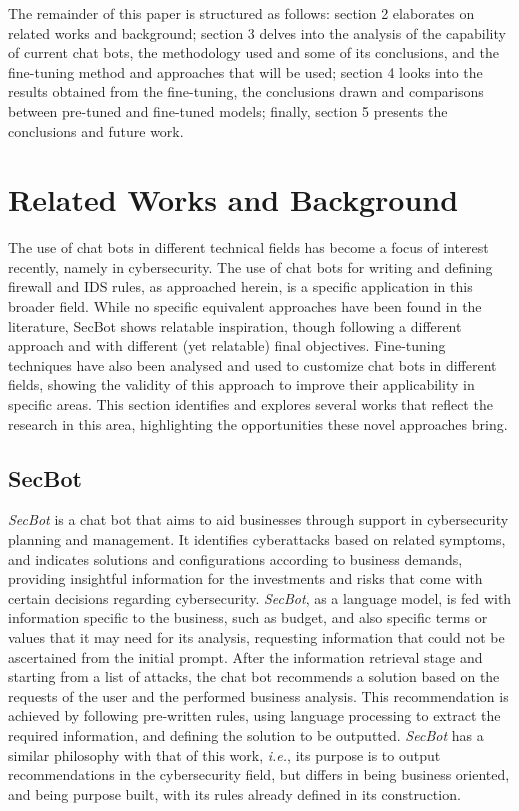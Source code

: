 \documentclass[sigconf]{acmart}
\begin{document}
The remainder of this paper is structured as follows: section 2 elaborates on related works and background; section 3 delves into the analysis of the capability of current chat bots, the methodology used and some of its conclusions, and the fine-tuning method and approaches that will be used; section 4 looks into the results obtained from the fine-tuning, the conclusions drawn and comparisons between pre-tuned and fine-tuned models; finally, section 5 presents the conclusions and future work.

\section{Related Works and Background}
The use of chat bots in different technical fields has become a focus of interest recently, namely in cybersecurity. The use of chat bots for writing and defining firewall and IDS rules, as approached herein, is a specific application in this broader field. While no specific equivalent approaches have been found in the literature, SecBot \cite{Franco20, Shaqiri21} shows relatable inspiration, though following a different approach and with different (yet relatable) final objectives. Fine-tuning techniques have also been analysed and used to customize chat bots in different fields, showing the validity of this approach to improve their applicability in specific areas. This section identifies and explores several works that reflect the research in this area, highlighting the opportunities these novel approaches bring.

\subsection{SecBot}
\textit{SecBot} \cite{Franco20, Shaqiri21} is a chat bot that aims to aid businesses through support in cybersecurity planning and management. It identifies cyberattacks based on related symptoms, and indicates solutions and configurations according to business demands, providing insightful information for the investments and risks that come with certain decisions regarding cybersecurity. \textit{SecBot}, as a language model, is fed with information specific to the business, such as budget, and also specific terms or values that it may need for its analysis, requesting information that could not be ascertained from the initial prompt. After the information retrieval stage and starting from a list of attacks, the chat bot recommends a solution based on the requests of the user and the performed business analysis. This recommendation is achieved by following pre-written rules, using language processing to extract the required information, and defining the solution to be outputted. \textit{SecBot} has a similar philosophy with that of this work, \textit{i.e.}, its purpose is to output recommendations in the cybersecurity field, but differs in being business oriented, and being purpose built, with its rules already defined in its construction.
\end{document}
